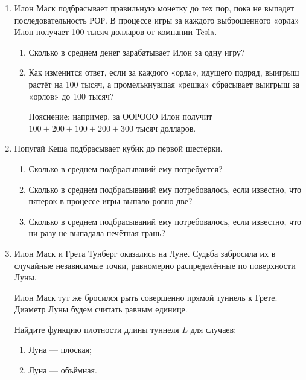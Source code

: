 \documentclass[12pt]{article}
\begin{document}


\begin{enumerate}
\item Илон Маск подбрасывает правильную монетку до тех пор, пока не выпадет последовательность
РОР. В процессе игры за каждого выброшенного «орла» Илон получает 100 тысяч долларов от компании Tesla.

\begin{enumerate}
  \item Сколько в среднем денег зарабатывает Илон за одну игру?
  \item Как изменится ответ, если за каждого «орла», идущего подряд, выигрыш растёт на 100 тысяч,
  а промелькнувшая «решка» сбрасывает выигрыш за «орлов» до 100 тысяч?

Пояснение: например, за ООРООО Илон получит $100 + 200 + 100 + 200 + 300$ тысяч долларов.
\end{enumerate}


\item Попугай Кеша подбрасывает кубик до первой шестёрки. 

\begin{enumerate}
  \item Сколько в среднем подбрасываний ему потребуется?
  \item Сколько в среднем подбрасываний ему потребовалось, если известно, что
  пятерок в процессе игры выпало ровно две?
  \item Сколько в среднем подбрасываний ему потребовалось, если известно, что
  ни разу не выпадала нечётная грань?
\end{enumerate}

\item Илон Маск и Грета Тунберг оказались на Луне. 
Судьба забросила их в случайные независимые точки, равномерно распределённые по поверхности Луны. 

Илон Маск тут же бросился рыть совершенно прямой туннель к
Грете. Диаметр Луны будем считать равным единице.

Найдите функцию плотности длины туннеля $L$ для случаев:

\begin{enumerate}
  \item Луна — плоская;
  \item Луна — объёмная.
\end{enumerate}



\end{enumerate}
\end{document}
